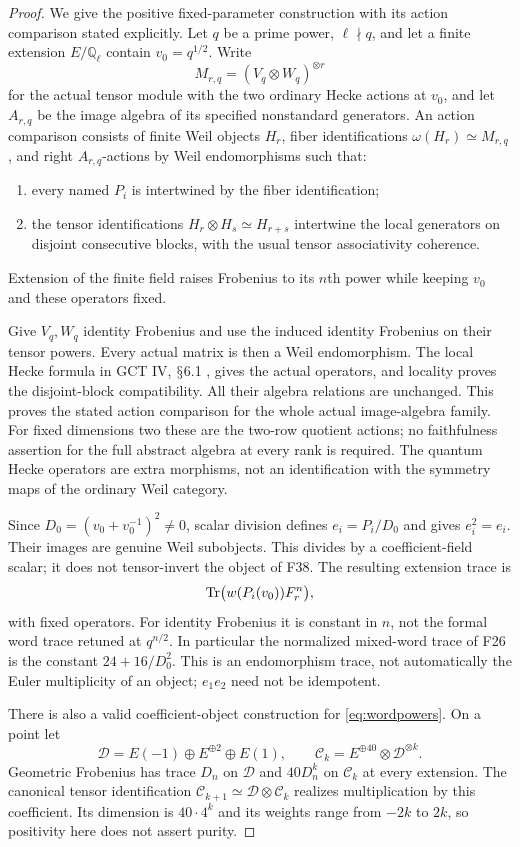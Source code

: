 \documentclass[11pt,a4paper]{article}
\newcommand{\Q}{\mathbb Q}\newcommand{\Z}{\mathbb Z}\newcommand{\C}{\mathbb C}\newcommand{\N}{\mathbb N}\newcommand{\F}{\mathbb F}
\renewcommand{\S}{\ensuremath{\mathsection}}
\newcommand{\fid}[1]{\textsf{#1}}\newcommand{\gate}[1]{\textsf{#1}}
\theoremstyle{named}\newtheorem{finding}{Finding}[section]
\theoremstyle{definition}\newtheorem{definition}[finding]{Definition}
\theoremstyle{remark}\newtheorem{remark}[finding]{Remark}
\begin{document}
\begin{proof}
We give the positive fixed-parameter construction with its
action comparison stated explicitly. Let $q$ be a prime power,
$\ell\nmid q$, and let a finite extension $E/\Q_\ell$
contain $v_0=q^{1/2}$.
Write
\[
 M_{r,q}=(V_q\otimes W_q)^{\otimes r}
\]
for the actual tensor module with the two ordinary Hecke
actions at $v_0$, and let $A_{r,q}$ be the image algebra of its
specified nonstandard generators. An action comparison consists
of finite Weil objects $H_r$, fiber identifications
$\omega(H_r)\simeq M_{r,q}$, and right $A_{r,q}$-actions
by Weil endomorphisms such that:
\begin{enumerate}
\item every named $P_i$ is intertwined by the fiber
identification;
\item the tensor identifications $H_r\otimes H_s\simeq H_{r+s}$
intertwine the local generators on disjoint consecutive blocks,
with the usual tensor associativity coherence.
\end{enumerate}
Extension of the finite field raises Frobenius to its $n$th
power while keeping $v_0$ and these operators fixed.

Give $V_q,W_q$ identity Frobenius and use the induced identity
Frobenius on their tensor powers. Every actual matrix is then
a Weil endomorphism. The local Hecke formula in
GCT IV, \S6.1 \cite[\S6.1, p.~33]{IV}, gives the actual operators, and locality proves
the disjoint-block compatibility. All their algebra relations
are unchanged. This proves the stated action comparison for
the whole actual image-algebra family.
For fixed dimensions two these are the two-row quotient actions;
no faithfulness assertion for the full abstract algebra at
every rank is required. The quantum Hecke operators are extra
morphisms, not an identification with the symmetry maps of the
ordinary Weil category.

Since $D_0=(v_0+v_0^{-1})^2\ne0$, scalar division defines
$e_i=P_i/D_0$ and gives $e_i^2=e_i$. Their images are genuine
Weil subobjects. This divides by a coefficient-field scalar;
it does not tensor-invert the object of \fid{F38}.
The resulting extension trace is
\[
 \operatorname{Tr}\bigl(w(P_i(v_0))F_r^n\bigr),
\]
with fixed operators. For identity Frobenius it is constant
in $n$, not the formal word trace retuned at $q^{n/2}$.
In particular the normalized mixed-word trace of \fid{F26}
is the constant $24+16/D_0^2$. This is an endomorphism trace,
not automatically the Euler multiplicity of an object;
$e_1e_2$ need not be idempotent.

There is also a valid coefficient-object construction for
\eqref{eq:wordpowers}. On a point let
\[
 \mathcal D=E(-1)\oplus E^{\oplus2}\oplus E(1),\qquad
 \mathcal C_k=E^{\oplus40}\otimes\mathcal D^{\otimes k}.
\]
Geometric Frobenius has trace $D_n$ on $\mathcal D$ and
$40D_n^k$ on $\mathcal C_k$ at every extension.
The canonical tensor identification
$\mathcal C_{k+1}\simeq\mathcal D\otimes\mathcal C_k$
realizes multiplication by this coefficient.
Its dimension is $40\cdot4^k$ and its weights range from
$-2k$ to $2k$, so positivity here does not assert purity.


\end{proof}
\end{document}
